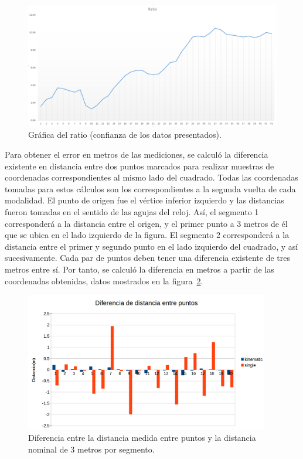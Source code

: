\begin{figure}[H]
\centering
\includegraphics[width=1\textwidth]{Figures/Ratio}
\caption[Gráfica del ratio (confianza de los datos presentados).]{Gráfica del ratio (confianza de los datos presentados).}
\label{fig:Ratio}
\end{figure}

Para obtener el error en metros de las mediciones, se calculó la diferencia existente en distancia entre dos puntos marcados para realizar muestras de coordenadas correspondientes al mismo lado del cuadrado. Todas las coordenadas tomadas para estos cálculos son los correspondientes a la segunda vuelta de cada modalidad. El punto de origen fue el vértice inferior izquierdo y las distancias fueron tomadas en el sentido de las agujas del reloj. Así, el segmento 1 corresponderá a la distancia entre el origen, y el primer punto a 3 metros de él que se ubica en el lado izquierdo de la figura. El segmento 2 corresponderá a la distancia entre el primer y segundo punto en el lado izquierdo del cuadrado, y así sucesivamente. Cada par de puntos deben tener una diferencia existente de tres metros entre sí. Por tanto, se calculó la diferencia en metros a partir de las coordenadas obtenidas, datos mostrados en la figura~\ref{fig:ErrMts}. 

\begin{figure}[H]
\centering
\includegraphics[width=0.95\textwidth]{Figures/ErrMts}
\caption[Diferencia entre la distancia medida entre puntos y la distancia nominal de 3 metros por segmento.]{Diferencia entre la distancia medida entre puntos y la distancia nominal de 3 metros por segmento.}
\label{fig:ErrMts}
\end{figure}


